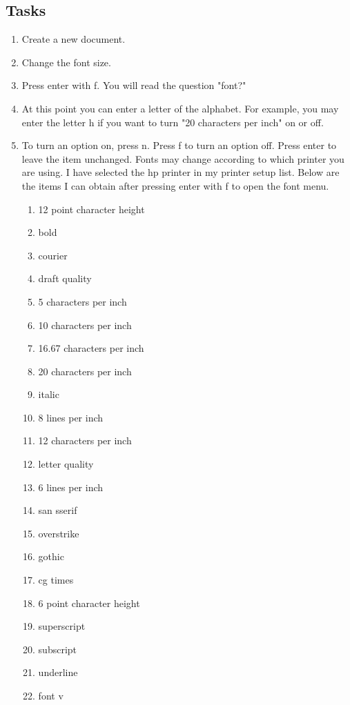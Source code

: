 \documentclass[10pt,letterpaper,twoside]{report}
\begin{document}
{{{\subsection{Tasks}
\begin{enumerate}
	\item Create a new document.
	\item Change the font size.
	\item Press enter with f.  You will read the question "font?"
	\item At this point you can enter a letter of the alphabet.  For example, you may enter the letter h if you want to turn "20 characters per inch" on or off.
	\item To turn an option on, press n.  Press f to turn an option off.  Press enter to leave the item unchanged. Fonts may change according to which printer you are using.  I have selected the hp printer in my printer setup list.  Below are the items I can obtain after pressing enter with f to open the font menu.
	      \begin{enumerate}
		      \item 12 point character height
		      \item bold
		      \item courier
		      \item draft quality
		      \item 5 characters per inch
		      \item 10 characters per inch
		      \item 16.67 characters per inch
		      \item 20 characters per inch
		      \item italic
		      \item 8 lines per inch
		      \item 12 characters per inch
		      \item letter quality
		      \item 6 lines per inch
		      \item san sserif
		      \item overstrike
		      \item gothic
		      \item cg times
		      \item 6 point character height
		      \item superscript
		      \item subscript
		      \item underline
		      \item font v

\end{enumerate}
\end{enumerate}}}}
\end{document}
